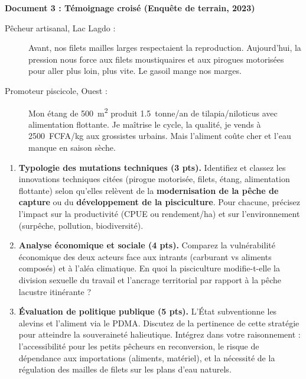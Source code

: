 \documentclass[11pt]{article}
\begin{document}
\begin{exercice}
\textbf{Document 3 : Témoignage croisé (Enquête de terrain, 2023)}

\begin{description}
\item[Pêcheur artisanal, Lac Lagdo :] \og Avant, nos filets mailles larges respectaient la reproduction. Aujourd'hui, la pression nous force aux filets moustiquaires et aux pirogues motorisées pour aller plus loin, plus vite. Le gasoil mange nos marges. \fg
\item[Promoteur piscicole, Ouest :] \og Mon étang de \SI{500}{m^2} produit \SI{1,5}{tonne/an} de tilapia/niloticus avec alimentation flottante. Je maîtrise le cycle, la qualité, je vends à \SI{2500}{FCFA/kg} aux grossistes urbains. Mais l'aliment coûte cher et l'eau manque en saison sèche. \fg
\end{description}

\begin{enumerate}
    \item \textbf{Typologie des mutations techniques (3 pts).} Identifiez et classez les innovations techniques citées (pirogue motorisée, filets, étang, alimentation flottante) selon qu'elles relèvent de la \textbf{modernisation de la pêche de capture} ou du \textbf{développement de la pisciculture}. Pour chacune, précisez l'impact sur la productivité (CPUE ou rendement/ha) et sur l'environnement (surpêche, pollution, biodiversité).
    \item \textbf{Analyse économique et sociale (4 pts).} Comparez la vulnérabilité économique des deux acteurs face aux intrants (carburant vs aliments composés) et à l'aléa climatique. En quoi la pisciculture modifie-t-elle la division sexuelle du travail et l'ancrage territorial par rapport à la pêche lacustre itinérante ?
    \item \textbf{Évaluation de politique publique (5 pts).} L'État subventionne les alevins et l'aliment via le PDMA. Discutez de la pertinence de cette stratégie pour atteindre la souveraineté halieutique. Intégrez dans votre raisonnement : l'accessibilité pour les petits pêcheurs en reconversion, le risque de dépendance aux importations (aliments, matériel), et la nécessité de la régulation des mailles de filets sur les plans d'eau naturels.
\end{enumerate}
\end{exercice}
\end{document}
